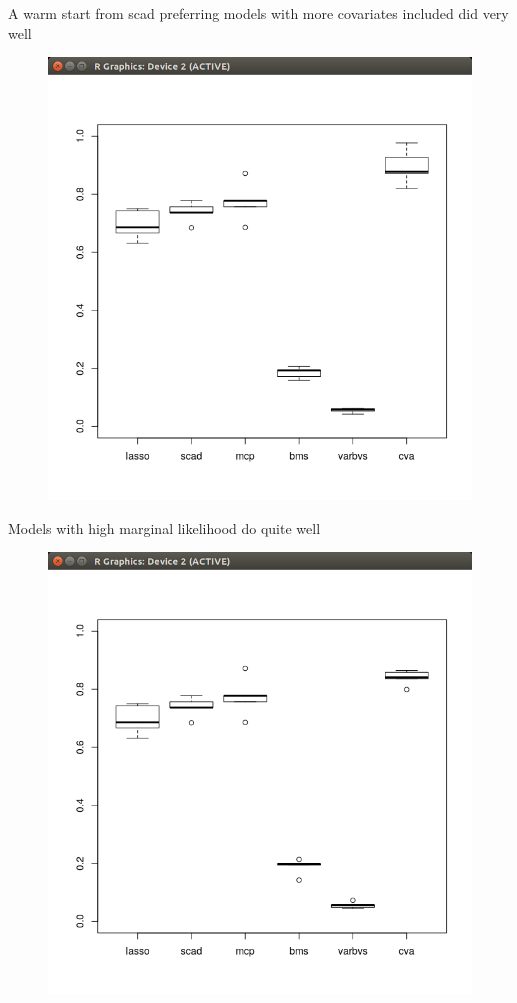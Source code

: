 \documentclass{beamer}
\begin{document}
\begin{frame}{A warm start from scad preferring models with more covariates included did very well}

\begin{figure}
\includegraphics[scale=0.33]{QLT_warm_start_covariates.png}
\end{figure}
\end{frame}

\begin{frame}{Models with high marginal likelihood do quite well}

\begin{figure}
\includegraphics[scale=0.33]{QLT_warm_start_marginal_likelihood.png}
\end{figure}
\end{frame}
\end{document}
